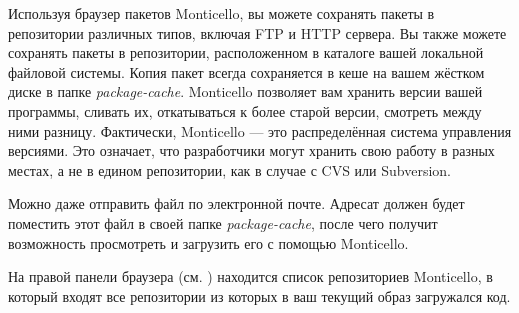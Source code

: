 \documentclass[a4paper,10pt,twoside]{book}
\begin{document}
Используя браузер пакетов Monticello, вы можете сохранять пакеты в репозитории различных типов, включая FTP и HTTP сервера. Вы также можете сохранять пакеты в репозитории, расположенном в каталоге вашей локальной файловой системы.
Копия пакет всегда сохраняется в кеше на вашем жёстком диске в папке \emph{package-cache}.
Monticello позволяет вам хранить версии вашей программы, сливать их, откатываться к более старой версии, смотреть между ними разницу. 
Фактически, Monticello --- это распределённая система управления версиями. Это означает, что разработчики могут хранить свою работу в разных местах, а не в едином репозитории, как в случае с CVS или Subversion.

Можно даже отправить файл  по электронной почте.
Адресат должен будет поместить этот файл в своей папке \emph{package-cache}, после чего получит возможность просмотреть и загрузить его с помощью Monticello.

На правой панели браузера (см. ) находится список репозиториев Monticello, в который входят все репозитории из которых в ваш текущий образ загружался код.
\end{document}
